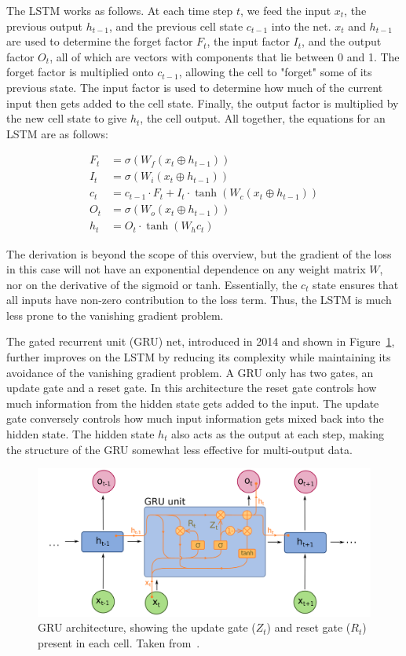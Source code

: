 The LSTM works as follows. At each time step $t$, we feed the input $x_t$, the previous output $h_{t-1}$, and the previous cell state $c_{t-1}$ into the net. $x_t$ and $h_{t-1}$ are used to determine the forget factor $F_t$, the input factor $I_t$, and the output factor $O_t$, all of which are vectors with components that lie between 0 and 1. The forget factor is multiplied onto $c_{t-1}$, allowing the cell to "forget" some of its previous state. The input factor is used to determine how much of the current input then gets added to the cell state. Finally, the output factor is multiplied by the new cell state to give $h_t$, the cell output. All together, the equations for an LSTM are as follows:

\begin{align}
    F_t &= \sigma(W_f (x_t \oplus h_{t-1})) \\
    I_t &= \sigma(W_i (x_t \oplus h_{t-1})) \\
    c_t &= c_{t-1} \cdot F_t + I_t \cdot\tanh(W_c (x_t \oplus h_{t-1})) \\
    O_t &= \sigma(W_o (x_t \oplus h_{t-1})) \\
    h_t &= O_t \cdot\tanh(W_h c_t)
\end{align}

The derivation is beyond the scope of this overview, but the gradient of the loss in this case will not have an exponential dependence on any weight matrix $W$, nor on the derivative of the sigmoid or tanh. Essentially, the $c_t$ state ensures that all inputs have non-zero contribution to the loss term. Thus, the LSTM is much less prone to the vanishing gradient problem.

The gated recurrent unit (GRU) net, introduced in 2014 and shown in Figure~\ref{fig:GRU_diagram}, further improves on the LSTM by reducing its complexity while maintaining its avoidance of the vanishing gradient problem. A GRU only has two gates, an update gate and a reset gate. In this architecture the reset gate controls how much information from the hidden state gets added to the input. The update gate conversely controls how much input information gets mixed back into the hidden state. The hidden state $h_t$ also acts as the output at each step, making the structure of the GRU somewhat less effective for multi-output data.

\begin{figure}[htbp]
    \centering
    \includegraphics[width=\linewidth]{Images/ML/GRU.png}
    \caption{GRU architecture, showing the update gate ($Z_t$) and reset gate ($R_t$) present in each cell. Taken from~\cite{GRUDiagram}.}
    \label{fig:GRU_diagram}
\end{figure}

